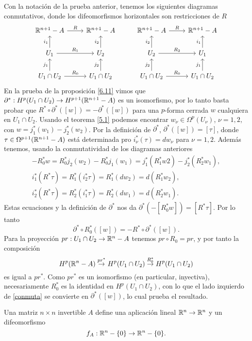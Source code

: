 \documentclass[CV.tex]{subfiles}
\begin{document}
\begin{dem}
Con la notación de la prueba anterior, tenemos los siguientes diagramas conmutativos, donde los difeomorfismos horizontales son restricciones de $R$
\[
\begin{tikzcd}
\R^{n+1}-A \arrow[r, "R"] & \R^{n+1}-A  &                               \R^{n+1}-A \arrow[r, "R"] & \R^{n+1}-A\\
U_1\arrow[u, "i_1"]\arrow[r, "R_1"] & U_2\arrow[u, "i_2"] &              U_2\arrow[u, "i_2"]\arrow[r, "R_2"] & U_1\arrow[u, "i_1"]\\
U_1\cap U_2\arrow[u, "j_1"]\arrow[r,"R_0"] & U_1\cap U_2\arrow[u, "j_2"]&U_1\cap U_2\arrow[u, "j_2"]\arrow[r,"R_0"] & U_1\cap U_2\arrow[u, "j_1"]
\end{tikzcd}
\]
En  la prueba de la proposición \ref{6.11} vimos que $\partial^*:H^p(U_1\cap U_2)\to H^{p+1}(\mathbb{R}^{n+1}-A)$ es un isomorfismo, por lo tanto basta probar que $R^*\circ\partial^*([w])=-\partial^*([w])$ para una $p$-forma cerrada $w$ cualquiera en $U_1\cap U_2$. Usando el teorema \ref{5.1} podemos encontrar $w_{\nu}\in \Omega^p(U_{\nu})$, $\nu=1,2$, con $w=j_1^*(w_1)-j_2^*(w_2)$. Por la definición de $\partial^*$, $\partial^*([w])=[\tau]$, donde $\tau\in \Omega^{p+1}(\mathbb{R}^{n+1}-A)$ está determinada pro $i_{\nu}^*(\tau)=dw_{\nu}$ para $\nu=1,2$. Además tenemos, usando la conmutatividad de los diagramas anteriores
\begin{gather*}
-R_0^*w=R_0^*j_2(w_2)-R_0^*j_1(w_1)=j_1^*(R_1^*w2)-j_2^*(R_2^*w_1),\\
i_1^*(R^*\tau)=R_1^*(i_2^*\tau)=R_1^*(dw_2)=d(R_1^*w_2),\\
i_2^*(R^*\tau)=R_2^*(i_1^*\tau)=R_2^*(dw_1)=d(R_2^*w_1).
\end{gather*}
Estas ecuaciones y la definición de $\partial^*$ nos da $\partial^*(-[R_0^*w])=[R^*\tau]$. Por lo tanto
\begin{equation}\label{conmuta}
\partial^*\circ R^*_0([w])=-R^*\circ\partial^*([w]).
\end{equation}
Para la proyección $pr:U_1\cap U_2\to \mathbb{R}^n-A$ tenemos $pr\circ R_0=pr$, y por tanto la composición
\[
H^p(\mathbb{R}^n-A)\overset{pr^*}{\to} H^p(U_1\cap U_2)\overset{R_0^*}{\to}H^p(U_1\cap U_2)
\]
es igual a $pr^*$. Como $pr^*$ es un isomorfismo (en particular, inyectiva), necesariamente $R_0^*$ es la identidad en $H^p(U_1\cap U_2)$, con lo que el lado izquierdo de \ref{conmuta} se convierte en $\partial^*([w])$, lo cual prueba el resultado.
\QED
\end{dem}


Una matriz $n\times n$ invertible $A$ define una aplicación lineal $\mathbb{R}^n\to\mathbb{R}^n$ y un difeomorfismo
\[
f_A:\mathbb{R}^n-\{0\}\to\mathbb{R}^n-\{0\}.
\]
\end{document}
